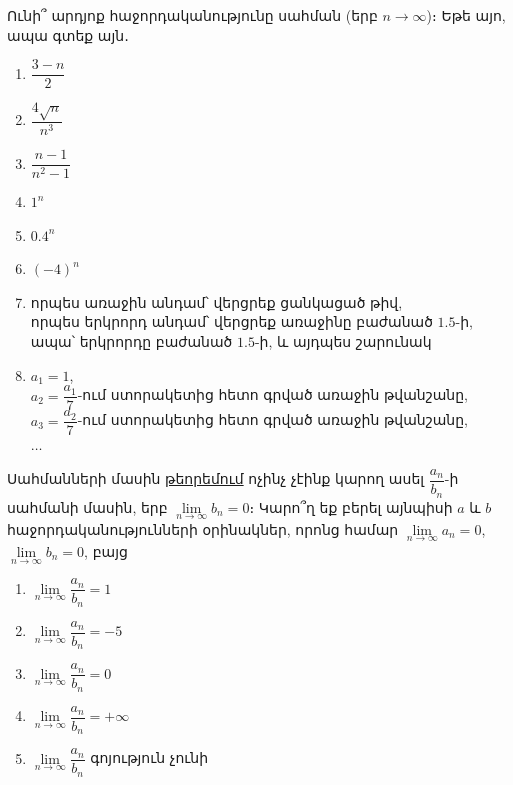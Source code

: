 \begin{problem}
Ունի՞ արդյոք հաջորդականությունը սահման (երբ $n\to\infty$)։ Եթե այո, ապա գտեք այն․

\begin{enumerate}[label={\alph*}․]
\item $\dfrac{3-n}{2}$

\item $\dfrac{4\sqrt{n}}{n^3}$

\item $\dfrac{n-1}{n^2-1}$

\item $1^n$

\item $0.4^n$

\item $(-4)^n$

\item որպես առաջին անդամ՝ վերցրեք ցանկացած թիվ, \\որպես երկրորդ անդամ՝ վերցրեք առաջինը բաժանած $1.5$-ի, \\ապա՝ երկրորդը բաժանած $1.5$-ի, և այդպես շարունակ

\item $a_1=1$, \\$a_2 = \dfrac{a_1}{7}$-ում ստորակետից հետո գրված առաջին թվանշանը, \\$a_3= \dfrac{a_2}{7}$-ում ստորակետից հետո գրված առաջին թվանշանը,
\\$\dots$

\end{enumerate}

\end{problem}


\begin{problem}
Սահմանների մասին \hyperref[limit_properties]{\color{OliveGreen}թեորեմում} ոչինչ չէինք կարող ասել $\dfrac{a_n}{b_n}$-ի սահմանի մասին, երբ $\lim\limits_{n\to\infty} b_n = 0$։ Կարո՞ղ եք բերել այնպիսի $a$ և $b$ հաջորդականությունների օրինակներ, որոնց համար $\lim\limits_{n\to\infty} a_n = 0$, $\lim\limits_{n\to\infty} b_n = 0$, բայց
\begin{enumerate}[label={\alph*}․]
\item $\lim\limits_{n\to\infty} \dfrac{a_n}{b_n} = 1$

\item $\lim\limits_{n\to\infty} \dfrac{a_n}{b_n} = -5$

\item $\lim\limits_{n\to\infty} \dfrac{a_n}{b_n} = 0$

\item $\lim\limits_{n\to\infty} \dfrac{a_n}{b_n} = +\infty$

\item $\lim\limits_{n\to\infty} \dfrac{a_n}{b_n}$ գոյություն չունի
\end{enumerate}
\end{problem}


